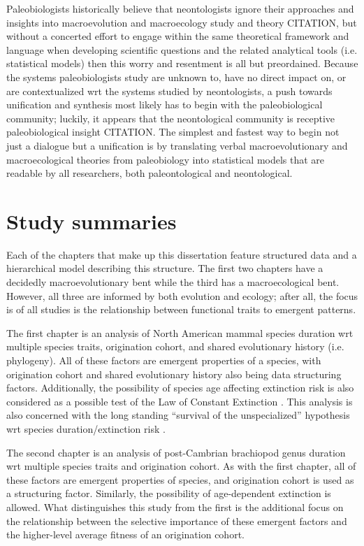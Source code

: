 Paleobiologists historically believe that neontologists ignore their approaches and insights into macroevolution and macroecology study and theory CITATION, but without a concerted effort to engage within the same theoretical framework and language when developing scientific questions and the related analytical tools (i.e. statistical models) then this worry and resentment is all but preordained. Because the systems paleobiologists study are unknown to, have no direct impact on, or are contextualized wrt the systems studied by neontologists, a push towards unification and synthesis most likely has to begin with the paleobiological community; luckily, it appears that the neontological community is receptive paleobiological insight CITATION. The simplest and fastest way to begin not just a dialogue but a unification is by translating verbal macroevolutionary and macroecological theories from paleobiology into statistical models that are readable by all researchers, both paleontological and neontological.


\section{Study summaries}  %

Each of the chapters that make up this dissertation feature structured data and a hierarchical model describing this structure. The first two chapters have a decidedly macroevolutionary bent while the third has a macroecological bent. However, all three are informed by both evolution and ecology; after all, the focus is of all studies is the relationship between functional traits to emergent patterns.

The first chapter is an analysis of North American mammal species duration wrt multiple species traits, origination cohort, and shared evolutionary history (i.e. phylogeny). All of these factors are emergent properties of a species, with origination cohort and shared evolutionary history also being data structuring factors. Additionally, the possibility of species age affecting extinction risk is also considered as a possible test of the Law of Constant Extinction \citep{VanValen1973}. This analysis is also concerned with the long standing ``survival of the unspecialized'' hypothesis wrt species duration/extinction risk \citep{Simpson1944}.

The second chapter is an analysis of post-Cambrian brachiopod genus duration wrt multiple species traits and origination cohort. As with the first chapter, all of these factors are emergent properties of species, and origination cohort is used as a structuring factor. Similarly, the possibility of age-dependent extinction is allowed. What distinguishes this study from the first is the additional focus on the relationship between the selective importance of these emergent factors and the higher-level average fitness of an origination cohort.

